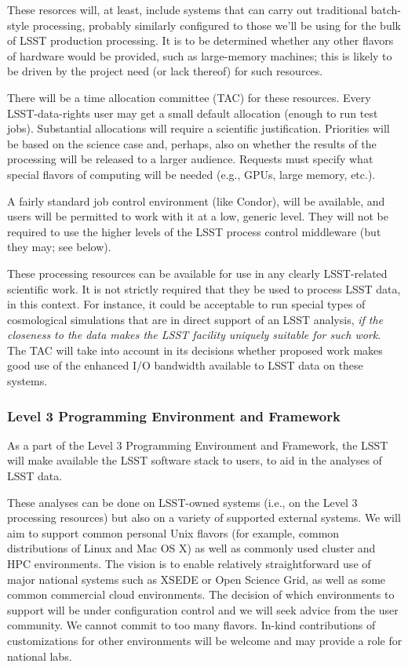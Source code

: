 \documentclass[12pt]{article}
\begin{document}
These resorces will, at least, include systems that can carry out traditional batch-style processing, probably similarly configured to those we'll be using for the bulk of LSST production processing.  It is to be determined whether any other flavors of hardware would be provided, such as large-memory machines; this is likely to be driven by the project need (or lack thereof) for such resources.

There will be a time allocation committee (TAC) for these resources.  Every LSST-data-rights user may get a small default allocation (enough to run test jobs).  Substantial allocations will require a scientific justification.  Priorities will be based on the science case and, perhaps, also on whether the results of the processing will be released to a larger audience.  Requests must specify what special flavors of computing will be needed (e.g., GPUs, large memory, etc.).

A fairly standard job control environment (like Condor), will be available, and users will be permitted to work with it at a low, generic level. They will not be required to use the higher levels of the LSST process control middleware (but they may; see below).

These processing resources can be available for use in any clearly LSST-related scientific work.  It is not strictly required that they be used to process LSST data, in this context.  For instance, it could be acceptable to run special types of cosmological simulations that are in direct support of an LSST analysis, {\em if the closeness to the data makes the LSST facility uniquely suitable for such work}. The TAC will take into account in its decisions whether proposed work makes good use of the enhanced I/O bandwidth available to LSST data on these systems.

\subsubsection{Level 3 Programming Environment and Framework}

As a part of the Level 3 Programming Environment and Framework, the LSST will make available the LSST software stack to users, to aid in the analyses of LSST data.

These analyses can be done on LSST-owned systems (i.e., on the Level 3 processing resources) but also on a variety of supported external systems.  We will aim to support common personal Unix flavors (for example, common distributions of Linux and Mac OS X) as well as commonly used cluster and HPC environments.  The vision is to enable relatively straightforward use of major national systems such as XSEDE or Open Science Grid, as well as some common commercial cloud environments.  The decision of which environments to support will be under configuration control and we will seek advice from the user community.  We cannot commit to too many flavors.  In-kind contributions of customizations for other environments will be welcome and may provide a role for national labs.
\end{document}
